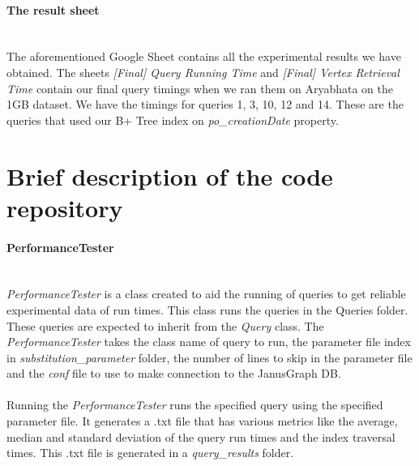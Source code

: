\paragraph{The result sheet}
$\:$\\
The aforementioned Google Sheet \cite{runtime} contains all the experimental results we have obtained. The sheets \textit{[Final] Query Running Time} and \textit{[Final] Vertex Retrieval Time} contain our final query timings when we ran them on Aryabhata on the 1GB dataset. We have the timings for queries 1, 3, 10, 12 and 14. These are the queries that used our B+ Tree index on \textit{po\_creationDate} property.

\section{Brief description of the code repository}

\paragraph{PerformanceTester}
$\:$\\
\textit{PerformanceTester} is a class created to aid the running of queries to get reliable experimental data of run times. This class runs the queries in the Queries folder. These queries are expected to inherit from the \textit{Query} class. The \textit{PerformanceTester} takes the class name of query to run, the parameter file index in \textit{substitution\_parameter} folder, the number of lines to skip in the parameter file and the \textit{conf} file to use to make connection to the JanusGraph DB.
\\\\
Running the \textit{PerformanceTester} runs the specified query using the specified parameter file. It generates a .txt file that has various metrics like the average, median and standard deviation of the query run times and the index traversal times. This .txt file is generated in a \textit{query\_results} folder.


